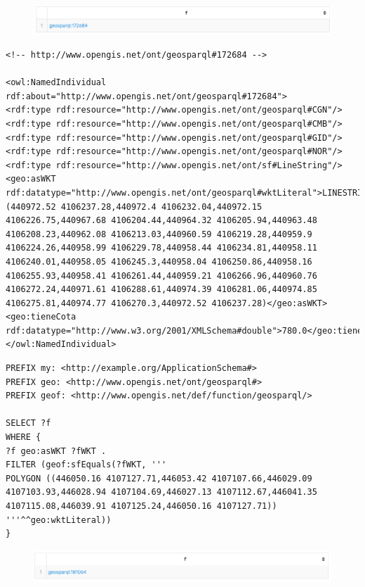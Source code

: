 \begin{figure}[H]
	\centering
	\includegraphics[width=0.7\linewidth]{imagenes/capitulo4/salida1}
	\caption{}
	\label{fig:salida1}
\end{figure}


\begin{lstlisting}
<!-- http://www.opengis.net/ont/geosparql#172684 -->

<owl:NamedIndividual rdf:about="http://www.opengis.net/ont/geosparql#172684">
<rdf:type rdf:resource="http://www.opengis.net/ont/geosparql#CGN"/>
<rdf:type rdf:resource="http://www.opengis.net/ont/geosparql#CMB"/>
<rdf:type rdf:resource="http://www.opengis.net/ont/geosparql#GID"/>
<rdf:type rdf:resource="http://www.opengis.net/ont/geosparql#NOR"/>
<rdf:type rdf:resource="http://www.opengis.net/ont/sf#LineString"/>
<geo:asWKT rdf:datatype="http://www.opengis.net/ont/geosparql#wktLiteral">LINESTRING (440972.52 4106237.28,440972.4 4106232.04,440972.15 4106226.75,440967.68 4106204.44,440964.32 4106205.94,440963.48 4106208.23,440962.08 4106213.03,440960.59 4106219.28,440959.9 4106224.26,440958.99 4106229.78,440958.44 4106234.81,440958.11 4106240.01,440958.05 4106245.3,440958.04 4106250.86,440958.16 4106255.93,440958.41 4106261.44,440959.21 4106266.96,440960.76 4106272.24,440971.61 4106288.61,440974.39 4106281.06,440974.85 4106275.81,440974.77 4106270.3,440972.52 4106237.28)</geo:asWKT>
<geo:tieneCota rdf:datatype="http://www.w3.org/2001/XMLSchema#double">780.0</geo:tieneCota>
</owl:NamedIndividual>
\end{lstlisting}


\begin{lstlisting}
PREFIX my: <http://example.org/ApplicationSchema#>
PREFIX geo: <http://www.opengis.net/ont/geosparql#>
PREFIX geof: <http://www.opengis.net/def/function/geosparql/>

SELECT ?f
WHERE {
?f geo:asWKT ?fWKT .
FILTER (geof:sfEquals(?fWKT, '''
POLYGON ((446050.16 4107127.71,446053.42 4107107.66,446029.09 4107103.93,446028.94 4107104.69,446027.13 4107112.67,446041.35 4107115.08,446039.91 4107125.24,446050.16 4107127.71))
'''^^geo:wktLiteral))
} 
\end{lstlisting}

\begin{figure}[H]
	\centering
	\includegraphics[width=0.7\linewidth]{imagenes/capitulo4/salida2}
	\caption{}
	\label{fig:salida2}
\end{figure}

